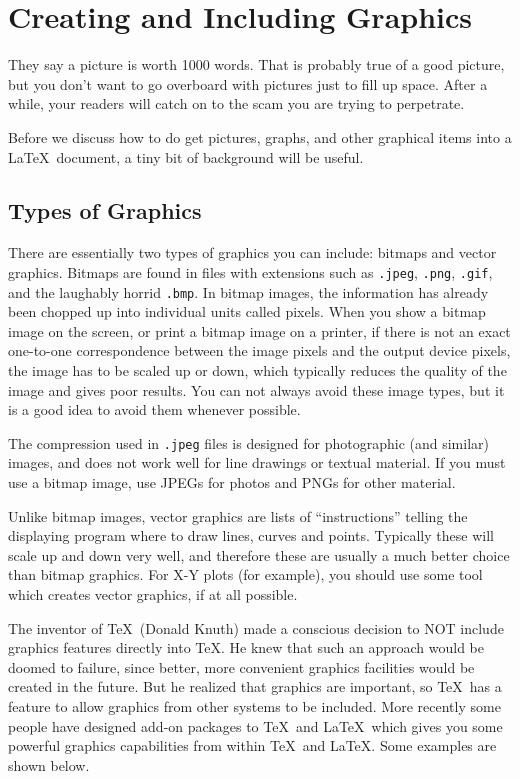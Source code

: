 \chapter{Creating and Including Graphics}
\label{chap:GRAPHICS}

They say a picture is worth 1000 words.  That is probably true of a
good picture, but you don't want to go overboard with pictures just to
fill up space.  After a while, your readers will catch on to the scam
you are trying to perpetrate.

Before we discuss how to do get pictures, graphs, and other graphical
items into a \LaTeX\ document, a tiny bit of background will be useful.

\section {Types of Graphics}

There are essentially two types of graphics you can include: bitmaps
and vector graphics.  Bitmaps are found in files with extensions such
as \verb|.jpeg|, \verb|.png|, \verb|.gif|, and the laughably horrid
\verb|.bmp|.  In bitmap images, the information has already been
chopped up into individual units called pixels.  When you show a
bitmap image on the screen, or print a bitmap image on a printer, if
there is not an exact one-to-one correspondence between the image
pixels and the output device pixels, the image has to be scaled up or
down, which typically reduces the quality of the image and gives poor
results.  You can not always avoid these image types, but it is a good
idea to avoid them whenever possible.

The compression used in \verb|.jpeg| files is designed for
photographic (and similar) images, and does not work well for line
drawings or textual material.  If you must use a bitmap image, use
JPEGs for photos and PNGs for other material.

Unlike bitmap images, vector graphics are lists of ``instructions''
telling the displaying program where to draw lines, curves and points.
Typically these will scale up and down very well, and therefore these
are usually a much better choice than bitmap graphics.  For X-Y plots
(for example), you should use some tool which creates vector graphics,
if at all possible.

The inventor of \TeX\ (Donald Knuth) made a conscious decision to NOT
include graphics features directly into \TeX.  He knew that such an
approach would be doomed to failure, since better, more convenient
graphics facilities would be created in the future.  But he realized
that graphics are important, so \TeX\ has a feature to allow graphics
from other systems to be included.  More recently some people have
designed add-on packages to \TeX\ and \LaTeX\ which gives you some
powerful graphics capabilities from within \TeX\ and \LaTeX.  Some
examples are shown below.


